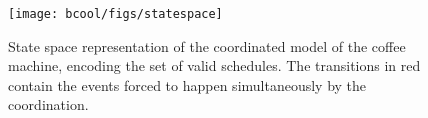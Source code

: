 \begin{figure}[]
	\begin{center}
		\texttt{[image: bcool/figs/statespace]}
		\caption{State space representation of the coordinated model of the coffee machine, encoding the set of valid schedules. The transitions in red contain the events forced to happen simultaneously by the coordination.}
		\label{fig:statespace}
	\end{center}
\end{figure}

	

	


